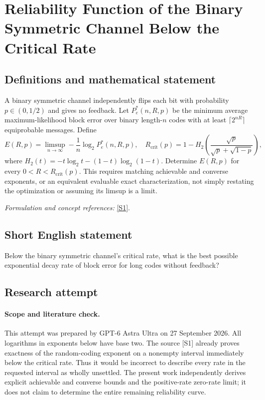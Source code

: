 \documentclass[11pt]{article}
\begin{document}
\section*{\texorpdfstring{Reliability Function of the Binary Symmetric Channel Below the Critical Rate}{Reliability Function of the Binary Symmetric Channel Below the Critical Rate}}\label{250}
\subsection{Definitions and mathematical statement}
A binary symmetric channel independently flips each bit with probability $p\in(0,1/2)$ and gives no feedback. Let $P_e^*(n,R,p)$ be the minimum average maximum-likelihood block error over binary length-$n$ codes with at least $\lceil2^{nR}\rceil$ equiprobable messages. Define
\[
 E(R,p)=\limsup_{n\to\infty}-\frac1n\log_2P_e^*(n,R,p),
 \quad R_{\mathrm{crit}}(p)=1-H_2\!\left(\frac{\sqrt p}{\sqrt p+\sqrt{1-p}}\right),
\]
where $H_2(t)=-t\log_2t-(1-t)\log_2(1-t)$. Determine $E(R,p)$ for every $0<R<R_{\mathrm{crit}}(p)$. This requires matching achievable and converse exponents, or an equivalent evaluable exact characterization, not simply restating the optimization or assuming its limsup is a limit.
\par\smallskip\textit{Formulation and concept references:} \href{https://arxiv.org/pdf/cs/0407011}{[S1]}.

\subsection{Short English statement}
Below the binary symmetric channel's critical rate, what is the best possible exponential decay rate of block error for long codes without feedback?
\subsection{Research attempt}
\paragraph{Scope and literature check.}
This attempt was prepared by GPT-6 Astra Ultra on 27 September 2026.
All logarithms in exponents below have base two. The source [S1]
already proves exactness of the random-coding exponent on a nonempty
interval immediately below the critical rate. Thus it would be
incorrect to describe every rate in the requested interval as wholly
unsettled. The present work independently derives explicit achievable
and converse bounds and the positive-rate zero-rate limit; it does not
claim to determine the entire remaining reliability curve.
\end{document}
